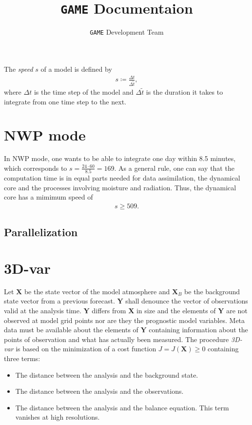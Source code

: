 \documentclass{article}
\title{\texttt{GAME} Documentaion}
\author{\texttt{GAME} Development Team}
\date{}
\begin{document}
\maketitle

The \textit{speed} $s$ of a model is defined by
%
\begin{eqnarray}
s \coloneqq \frac{\Delta t}{\Delta\tilde{t}},
\end{eqnarray}
%
where $\Delta t$ is the time step of the model and $\Delta\tilde{t}$ is the duration it takes to integrate from one time step to the next.

\section{NWP mode}
\label{sec:nwp_mode}

In NWP mode, one wants to be able to integrate one day within 8.5 minutes, which corresponds to $s = \frac{24\cdot 60}{8.5} = 169$. As a general rule, one can say that the computation time is in equal parts needed for data assimilation, the dynamical core and the processes involving moisture and radiation. Thus, the dynamical core has a mimimum speed of
%
\begin{eqnarray}
s \geq 509.
\end{eqnarray}

\subsection{Parallelization}
\label{sec:parallelization}

\section{3D-var}
\label{sec:3d-var}

Let $\mathbf{X}$ be the state vector of the model atmosphere and $\mathbf{X}_B$ be the background state vector from a previous forecast. $\mathbf{Y}$ shall denounce the vector of observations valid at the analysis time. $\mathbf{Y}$ differs from $\mathbf{X}$ in size and the elements of $\mathbf{Y}$ are not observed at model grid points nor are they the prognostic model variables. Meta data must be available about the elements of $\mathbf{Y}$ containing information about the points of observation and what has actually been measured. The procedure \textit{3D-var} is based on the minimization of a cost function $J = J\left(\mathbf{X}\right) \geq 0$ containing three terms:
%
\begin{itemize}
\item The distance between the analysis and the background state.
\item The distance between the analysis and the observations.
\item The distance between the analysis and the balance equation. This term vanishes at high resolutions.
\end{itemize}
\end{document}
